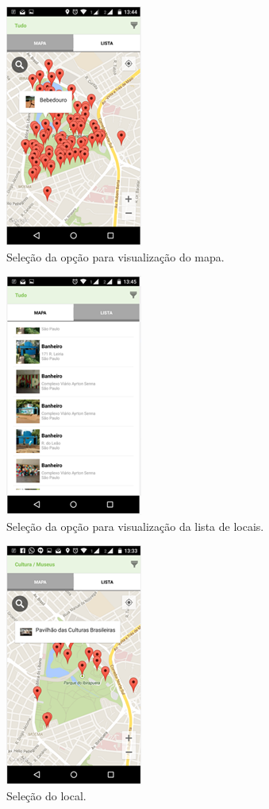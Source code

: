 \begin{figure}[H]
	 \centering
	\label{Seleção da opção para visualização do mapa}
	 \includegraphics[keepaspectratio=true,scale=0.8]{interacao/18.png}
	 \caption{Seleção da opção para visualização do mapa.}
\end{figure}

\begin{figure}[H]
	 \centering
	\label{Seleção da opção para visualização da lista de locais}
	 \includegraphics[keepaspectratio=true,scale=0.8]{interacao/19.png}
	 \caption{Seleção da opção para visualização da lista de locais.}
\end{figure}
	
\begin{figure}[H]
	 \centering
	\label{Seleção do local}
	 \includegraphics[keepaspectratio=true,scale=0.8]{interacao/20.png}
	 \caption{Seleção do local.}
\end{figure}

